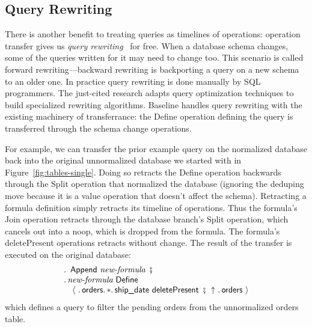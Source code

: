 \documentclass[english,submission]{programming}
\theoremstyle{definition}
\DeclareMathOperator{\exec}{\ \fatsemi\ \ }
\begin{document}





\subsection{Query Rewriting}\label{query-rewriting}

There is another benefit to treating queries as timelines of operations: operation transfer gives us \textit{query rewriting}~\cite{curino08, herrmann17} for free. When a database schema changes, some of the queries written for it may need to change too. This scenario is called forward rewriting---backward rewriting is backporting a query on a new schema to an older one.
In practice query rewriting is done manually by SQL programmers. The just-cited research adapts query optimization techniques to build specialized rewriting algorithms.
Baseline handles query rewriting with the existing machinery of transferrance: the \textsf{Define} operation defining the query is transferred through the schema change operations.

For example, we can transfer the prior example query on the normalized database back into the original unnormalized database we started with in Figure~\ref{fig:tables-single}. Doing so retracts the \textsf{Define} operation backwards through the \textsf{Split} operation that normalized the database (ignoring the deduping \textsf{move} because it is a value operation that doesn't affect the schema). Retracting a formula definition simply retracts its timeline of operations. Thus the formula's \textsf{Join} operation retracts through the database branch's \textsf{Split} operation, which cancels out into a \textsf{noop}, which is dropped from the formula. The formula's \textsf{deletePresent} operations retracts without change. The result of the transfer is executed on the original database:
\[
\begin{array}{l}
  \ldotp \textsf{ Append } \textit{new-formula} \exec\\
  \ldotp \textit{new-formula} \textsf{ Define } \\
  \quad \langle
\ \ldotp \textsf{orders}\ldotp * \ldotp \textsf{ship\_date deletePresent} \exec
\!\!\uparrow \ \ldotp \textsf{orders}\
  \rangle\\
\end{array}
\]
which defines a query to filter the pending orders from the unnormalized orders table.
\end{document}

